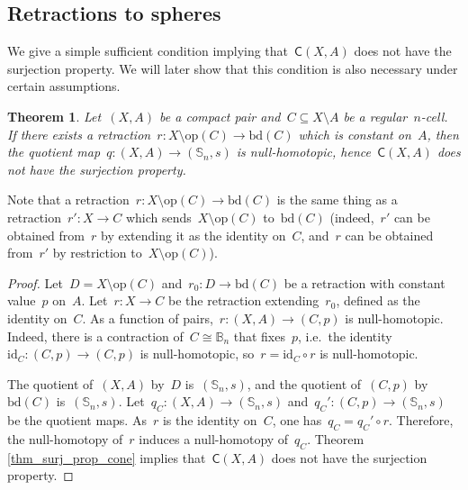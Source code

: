 \documentclass[english,11pt]{article}
\theoremstyle{plain}
\newtheorem{theorem}{Theorem}[section]
\theoremstyle{remark}
\theoremstyle{definition}
\newcommand{\id}{\mathrm{id}}
\newcommand{\bd}[1]{\mathrm{bd}(#1)}
\newcommand{\op}[1]{\mathrm{op}(#1)}
\newcommand{\Sp}{\mathbb{S}}
\newcommand{\BB}{\mathbb{B}}
\newcommand{\C}[1]{\mathsf{C}(#1)}%
\begin{document}
\subsection{Retractions to spheres}
We give a simple sufficient condition implying that~$\C{X,A}$ does not have the surjection property. We will later show that this condition is also necessary under certain assumptions.
\begin{theorem}\label{thm_retraction_quotient}
Let~$(X,A)$ be a compact pair and~$C\subseteq X\setminus A$ be a regular~$n$-cell. If there exists a retraction~$r:X\setminus \op{C}\to \bd{C}$ which is constant on~$A$, then the quotient map~$q:(X,A)\to (\Sp_n,s)$ is null-homotopic, hence~$\C{X,A}$ does not have the surjection property.
\end{theorem}
Note that a retraction~$r:X\setminus \op{C}\to\bd{C}$ is the same thing as a retraction~$r':X\to C$ which sends~$X\setminus \op{C}$ to~$\bd{C}$ (indeed,~$r'$ can be obtained from~$r$ by extending it as the identity on~$C$, and~$r$ can be obtained from~$r'$ by restriction to~$X\setminus \op{C}$).
\begin{proof}
Let~$D=X\setminus \op{C}$ and~$r_0:D\to\bd C$ be a retraction with constant value~$p$ on~$A$. Let~$r:X\to C$ be the retraction extending~$r_0$, defined as the identity on~$C$. As a function of pairs,~$r:(X,A)\to (C,p)$ is null-homotopic. Indeed, there is a contraction of~$C\cong \BB_n$ that fixes~$p$, i.e.~the identity~$\id_C:(C,p)\to (C,p)$ is null-homotopic, so~$r=\id_C\circ r$ is null-homotopic.

The quotient of~$(X,A)$ by~$D$ is~$(\Sp_n,s)$, and the quotient of~$(C,p)$ by~$\bd{C}$ is~$(\Sp_n,s)$. Let~$q_C:(X,A)\to (\Sp_n,s)$ and~$q_C':(C,p)\to (\Sp_n,s)$ be the quotient maps. As~$r$ is the identity on~$C$, one has~$q_C=q_C'\circ r$. Therefore, the null-homotopy of~$r$ induces a null-homotopy of~$q_C$. Theorem \ref{thm_surj_prop_cone} implies that~$\C{X,A}$ does not have the surjection property.
\end{proof}
\end{document}
